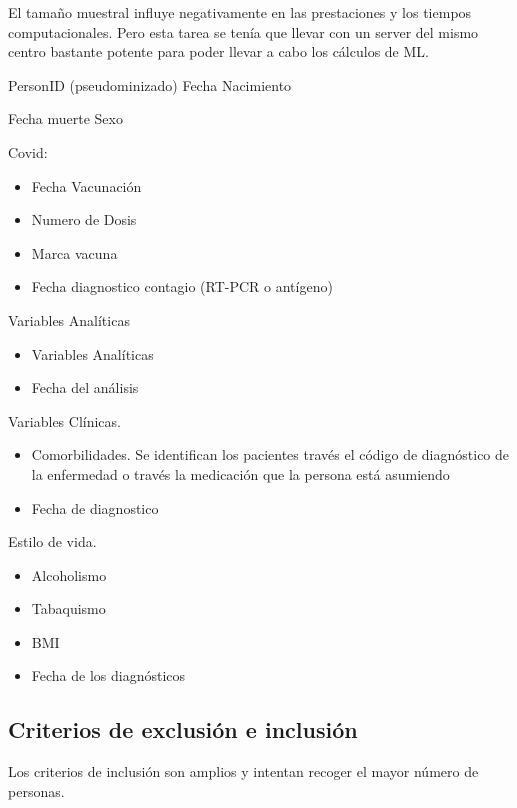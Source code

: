\documentclass[
]{article}
\begin{document}
El tamaño muestral influye negativamente en las prestaciones y los
tiempos computacionales. Pero esta tarea se tenía que llevar con un
server del mismo centro bastante potente para poder llevar a cabo los
cálculos de ML.

PersonID (pseudominizado) Fecha Nacimiento

Fecha muerte Sexo

Covid:

\begin{itemize}
\item
  Fecha Vacunación
\item
  Numero de Dosis
\item
  Marca vacuna
\item
  Fecha diagnostico contagio (RT-PCR o antígeno)
\end{itemize}

Variables Analíticas

\begin{itemize}
\item
  Variables Analíticas
\item
  Fecha del análisis
\end{itemize}

Variables Clínicas.

\begin{itemize}
\item
  Comorbilidades. Se identifican los pacientes través el código de
  diagnóstico de la enfermedad o través la medicación que la persona
  está asumiendo
\item
  Fecha de diagnostico
\end{itemize}

Estilo de vida.

\begin{itemize}
\item
  Alcoholismo
\item
  Tabaquismo
\item
  BMI
\item
  Fecha de los diagnósticos
\end{itemize}

\hypertarget{criterios-de-exclusiuxf3n-e-inclusiuxf3n}{%
\subsection{Criterios de exclusión e
inclusión}\label{criterios-de-exclusiuxf3n-e-inclusiuxf3n}}

Los criterios de inclusión son amplios y intentan recoger el mayor
número de personas.
\end{document}
